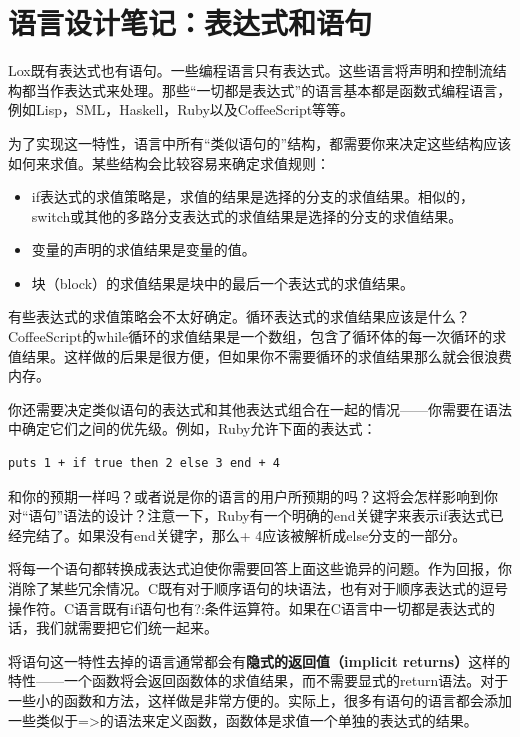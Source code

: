 \documentclass[cn,10pt,math=newtx,citestyle=gb7714-2015,bibstyle=gb7714-2015]{elegantbook}
\begin{document}
\section{语言设计笔记：表达式和语句}

Lox既有表达式也有语句。一些编程语言只有表达式。这些语言将声明和控制流结构都当作表达式来处理。那些“一切都是表达式”的语言基本都是函数式编程语言，例如Lisp，SML，Haskell，Ruby以及CoffeeScript等等。

为了实现这一特性，语言中所有“类似语句的”结构，都需要你来决定这些结构应该如何来求值。某些结构会比较容易来确定求值规则：

\begin{itemize}
   \item if表达式的求值策略是，求值的结果是选择的分支的求值结果。相似的，switch或其他的多路分支表达式的求值结果是选择的分支的求值结果。
   \item 变量的声明的求值结果是变量的值。
   \item 块（block）的求值结果是块中的最后一个表达式的求值结果。
\end{itemize}

有些表达式的求值策略会不太好确定。循环表达式的求值结果应该是什么？CoffeeScript的while循环的求值结果是一个数组，包含了循环体的每一次循环的求值结果。这样做的后果是很方便，但如果你不需要循环的求值结果那么就会很浪费内存。

你还需要决定类似语句的表达式和其他表达式组合在一起的情况——你需要在语法中确定它们之间的优先级。例如，Ruby允许下面的表达式：

\begin{verbatim}
puts 1 + if true then 2 else 3 end + 4
\end{verbatim}

和你的预期一样吗？或者说是你的语言的用户所预期的吗？这将会怎样影响到你对“语句”语法的设计？注意一下，Ruby有一个明确的end关键字来表示if表达式已经完结了。如果没有end关键字，那么+ 4应该被解析成else分支的一部分。

将每一个语句都转换成表达式迫使你需要回答上面这些诡异的问题。作为回报，你消除了某些冗余情况。C既有对于顺序语句的块语法，也有对于顺序表达式的逗号操作符。C语言既有if语句也有?:条件运算符。如果在C语言中一切都是表达式的话，我们就需要把它们统一起来。

将语句这一特性去掉的语言通常都会有\textbf{隐式的返回值（implicit returns）}这样的特性——一个函数将会返回函数体的求值结果，而不需要显式的return语法。对于一些小的函数和方法，这样做是非常方便的。实际上，很多有语句的语言都会添加一些类似于=>的语法来定义函数，函数体是求值一个单独的表达式的结果。
\end{document}
